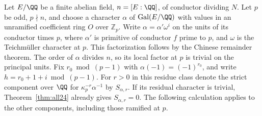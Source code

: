 \documentclass[a4paper,11pt]{article}
\theoremstyle{definition}
\theoremstyle{remark}
\newcommand{\ZZ}{\mathbb Z}\newcommand{\ord}{\operatorname{ord}}
\numberwithin{equation}{section}
\begin{document}
Let \(E/\QQ\) be a finite abelian field, \(n=[E:\QQ]\), of
conductor dividing \(N\). Let \(p\) be odd, \(p\nmid n\), and
choose a character \(\alpha\) of \(\operatorname{Gal}(E/\QQ)\)
with values in an unramified coefficient ring \(O\) over \(\ZZ_p\).
Write \(\alpha=\alpha'\omega^i\) on the units of its conductor
times \(p\), where \(\alpha'\) is primitive of conductor \(f\)
prime to \(p\), and \(\omega\) is the Teichm\"uller character
at \(p\). This factorization follows by the Chinese remainder
theorem. The order of \(\alpha\) divides \(n\), so its local
factor at \(p\) is trivial on the principal units.
Fix \(r_0\bmod(p-1)\) with \(\alpha(-1)=(-1)^{r_0}\), and write
\(h=r_0+1+i\bmod(p-1)\).
For \(r>0\) in this residue class denote the strict component
over \(\QQ\) for \(\kappa_p^{-r}\alpha^{-1}\) by \(S_{\alpha,r}\).
If its residual character is trivial, Theorem~\ref{thm:all24}
already gives \(S_{\alpha,r}=0\). The following calculation
applies to the other components, including those ramified at \(p\).
\end{document}
